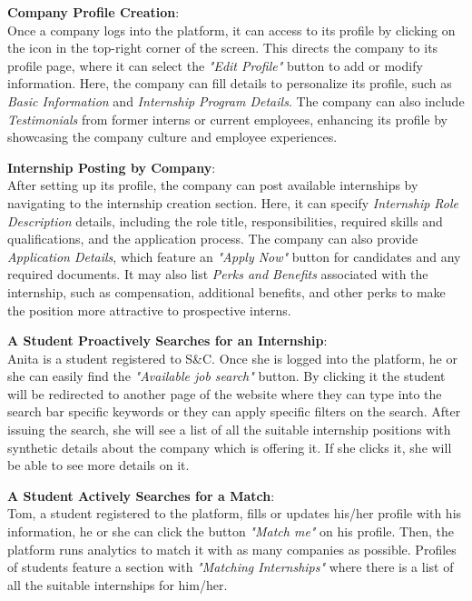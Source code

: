 {\begin{enumerate}[label=\textbf{[\arabic*]}, left = 0 pt, align = left]
            \item \textbf{Company Profile Creation}:                        %
            \\Once a company logs into the platform, it can access to its profile by clicking on the icon in the
            top-right corner of the screen. This directs the company to its profile page, where it can select the \textit{"Edit Profile"} button to add or modify information. Here, the company can fill details to personalize its profile, such as \textit{Basic Information} and \textit{Internship Program Details}.
            The company can also include \textit{Testimonials} from former interns or current employees, enhancing its profile by showcasing the company culture and employee experiences.
            
            \item \textbf{Internship Posting by Company}:                   %
            \\After setting up its profile, the company can post available internships by navigating to the internship creation section. Here, it can specify \textit{Internship Role Description} details, including the role title, responsibilities, required skills and qualifications, and the application process.
            The company can also provide \textit{Application Details}, which feature an \textit{"Apply Now"} button for candidates and any required documents. It may also list \textit{Perks and Benefits} associated with the internship, such as compensation, additional benefits, and other perks to make the position more attractive to prospective interns.
            
            \item \textbf{A Student Proactively Searches for an Internship}:  %
            \\Anita is a student registered to S\&C. Once she is logged into the platform, he or she can easily find the \textit{"Available job search"} button. By clicking it the student will be redirected to another page of the website where they can type into the search bar specific keywords or they can apply specific filters on the search. After issuing the search, she will see a list of all the suitable internship positions with synthetic details about the company which is offering it. If she clicks it, she will be able to see more details on it.
            
            \item \textbf{A Student Actively Searches for a Match}:     %
            \\Tom, a student registered to the platform, fills or updates his/her profile with his information, he or she can click the button \textit{"Match me"} on his profile. Then, the platform runs analytics to match it with as many companies as possible. Profiles of students feature a section with \textit{"Matching Internships"} where there is a list of all the suitable internships for him/her.
            

\end{enumerate}}
